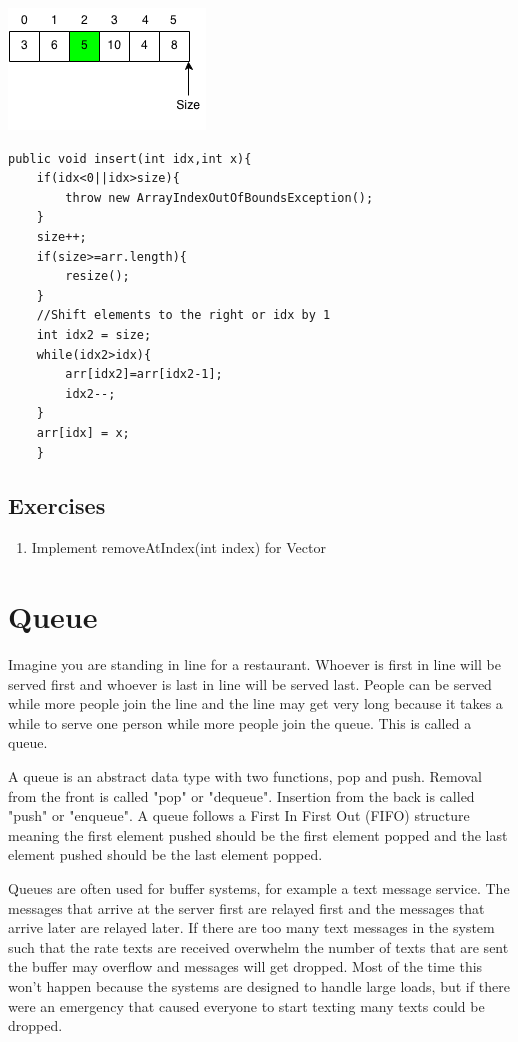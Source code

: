 \documentclass[11pt,oneside]{book}
\makeatletter
\def\maxwidth#1{\ifdim\Gin@nat@width>#1 #1\else\Gin@nat@width\fi}
\makeatother
\begin{document}
\includegraphics[width=\maxwidth{\textwidth}]{vectorinsert2.png}

\begin{lstlisting}
public void insert(int idx,int x){
    if(idx<0||idx>size){
        throw new ArrayIndexOutOfBoundsException();
    }
    size++;
    if(size>=arr.length){
        resize();
    }
    //Shift elements to the right or idx by 1
    int idx2 = size;
    while(idx2>idx){
        arr[idx2]=arr[idx2-1];
        idx2--;
    }   
    arr[idx] = x;
    }
\end{lstlisting}

\subsection{Exercises}

\begin{enumerate}
\item Implement removeAtIndex(int index) for Vector
\end{enumerate}
\section{Queue}

Imagine you are standing in line for a restaurant. Whoever is first in line will be served first and whoever is last in line will be served last. People can be served while more people join the line and the line may get very long because it takes a while to serve one person while more people join the queue. This is called a queue.

A queue is an abstract data type with two functions, pop and push. Removal from the front is called "pop" or "dequeue". Insertion from the back is called "push" or "enqueue". A queue follows a First In First Out (FIFO) structure meaning the first element pushed should be the first element popped and the last element pushed should be the last element popped.

Queues are often used for buffer systems, for example a text message service. The messages that arrive at the server first are relayed first and the messages that arrive later are relayed later. If there are too many text messages in the system such that the rate  texts are received overwhelm the number of texts that are sent the buffer may overflow and messages will get dropped. Most of the time this won't happen because the systems are designed to handle large loads, but if there were an emergency that caused everyone to start texting many texts could be dropped.
\end{document}
